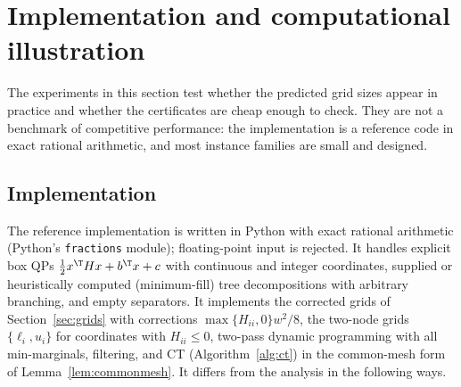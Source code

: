 \section{Implementation and computational illustration}\label{sec:computation}

The experiments in this section test whether the predicted grid sizes appear
in practice and whether the certificates are cheap enough to check. They are
not a benchmark of competitive performance: the implementation is a reference
code in exact rational arithmetic, and most instance families are small and
designed.

\subsection{Implementation}\label{sec:comp-impl}
The reference implementation is written in Python with exact rational
arithmetic (Python's \texttt{fractions} module); floating-point input is
rejected. It handles explicit box QPs $\frac12x^\T Hx+b^\T x+c$ with continuous
and integer coordinates, supplied or heuristically computed (minimum-fill)
tree decompositions with arbitrary branching, and empty separators. It
implements the corrected grids of Section~\ref{sec:grids} with corrections
$\max\{H_{ii},0\}w^2/8$, the two-node grids $\{\ell_i,u_i\}$ for coordinates
with $H_{ii}\le0$, two-pass dynamic programming with all min-marginals,
filtering, and CT (Algorithm~\ref{alg:ct}) in the common-mesh form of
Lemma~\ref{lem:commonmesh}. It differs from the analysis in the following
ways.
